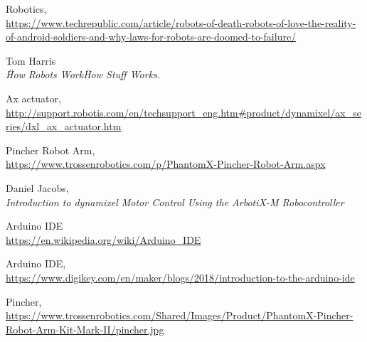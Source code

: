 \begin{thebibliography}{9}

	Robotics,
	\\\url{https://www.techrepublic.com/article/robots-of-death-robots-of-love-the-reality-of-android-soldiers-and-why-laws-for-robots-are-doomed-to-failure/}
	
	Tom Harris\\
	\textit{\"How Robots Work\" How Stuff Works}. 	

	Ax actuator,
	\\\url{http://support.robotis.com/en/techsupport_eng.htm#product/dynamixel/ax_series/dxl_ax_actuator.htm}
	
	Pincher Robot Arm,
	\\\url{https://www.trossenrobotics.com/p/PhantomX-Pincher-Robot-Arm.aspx}
	
	Daniel Jacobs,\\
	\textit{Introduction to dynamixel Motor Control Using the ArbotiX-M Robocontroller}

	Arduino IDE
	\\\url{https://en.wikipedia.org/wiki/Arduino_IDE}
	

	Arduino IDE,
	\\\url{https://www.digikey.com/en/maker/blogs/2018/introduction-to-the-arduino-ide}
	
	Pincher,
	\\\url{https://www.trossenrobotics.com/Shared/Images/Product/PhantomX-Pincher-Robot-Arm-Kit-Mark-II/pincher.jpg}

\end{thebibliography}